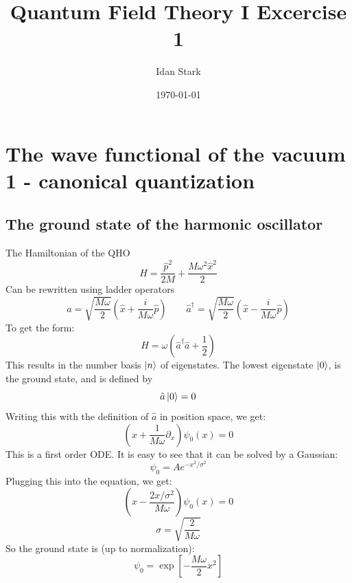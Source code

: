 \documentclass{article}
\title{Quantum Field Theory I Excercise 1}
\author{Idan Stark}
\date{\today}
\begin{document}
\maketitle

\section{The wave functional of the vacuum 1 - canonical quantization}
\subsection{The ground state of the harmonic oscillator}
The Hamiltonian of the QHO
\begin{equation}
    H = \frac{\hat{p}^2}{2M} + \frac{M\omega^2\hat{x}^2}{2}
\end{equation}
Can be rewritten using ladder operators
\begin{equation}
    \hat{a} = \sqrt{\frac{M\omega}{2}}\left(\hat{x} + \frac{i}{M\omega}\hat{p}\right)
    \qquad
    \hat{a}^\dagger = \sqrt{\frac{M\omega}{2}}\left(\hat{x} - \frac{i}{M\omega}\hat{p}\right)
\end{equation}
To get the form:
\begin{equation}
    H = \omega\left(\hat{a}^\dagger\hat{a} + \frac{1}{2}\right)
\end{equation}
This results in the number basis $\ket{n}$ of eigenstates. The lowest eigenstate $\ket{0}$, is the ground state, and is defined by
\begin{equation}
    \hat{a}\ket{0} = 0
\end{equation}
Writing this with the definition of $\hat{a}$ in position space, we get:
\begin{equation}
    \left(x + \frac{1}{M\omega}\partial_x\right)\psi_0(x) = 0
\end{equation}
This is a first order ODE. It is easy to see that it can be solved by a Gaussian:
\begin{equation}
    \psi_0 = Ae^{-x^2/\sigma^2}
\end{equation}
Plugging this into the equation, we get:
\begin{equation}
    \left(x - \frac{2x/\sigma^2}{M\omega}\right)\psi_0(x) = 0
\end{equation}
\begin{equation}
    \sigma = \sqrt{\frac{2}{M\omega}}
\end{equation}
So the ground state is (up to normalization):
\begin{equation}
    \psi_0 = \exp[-\frac{M\omega}{2}x^2]
\end{equation}
\end{document}
